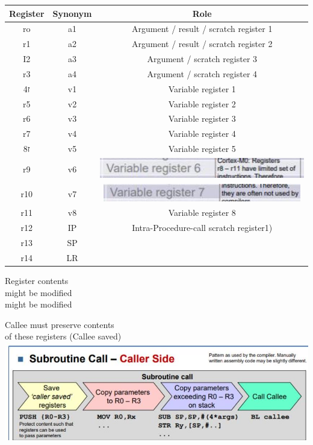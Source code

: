 \documentclass[10pt]{article}
\begin{document}
\begin{center}
\begin{tabular}{|c|c|c|}
\hline
Register & Synonym & Role \\
\hline
ro & a1 & Argument / result / scratch register 1 \\
\hline
r1 & a2 & Argument / result / scratch register 2 \\
\hline
I2 & a3 & Argument / scratch register 3 \\
\hline
r3 & a4 & Argument / scratch register 4 \\
\hline
ז4 & v1 & Variable register 1 \\
\hline
r5 & v2 & Variable register 2 \\
\hline
r6 & v3 & Variable register 3 \\
\hline
r7 & v4 & Variable register 4 \\
\hline
ז8 & v5 & Variable register 5 \\
\hline
r9 & v6 & \includegraphics[width=\linewidth]{images/2024_12_29_79e6b22f503fb7b4f718g-09}
 \\
\hline
r10 & v7 & \includegraphics[width=\linewidth]{images/2024_12_29_79e6b22f503fb7b4f718g-09(1)}
 \\
\hline
r11 & v8 & Variable register 8 \\
\hline
r12 & IP & Intra-Procedure-call scratch register1) \\
\hline
r13 & SP &  \\
\hline
r14 & LR &  \\
\hline
\end{tabular}
\end{center}

Register contents\\
might be modified\\
might be modified

Callee must preserve contents\\
of these registers (Callee saved)\\
\includegraphics[width=\linewidth]{images/2024_12_29_79e6b22f503fb7b4f718g-09(3)}
\end{document}

